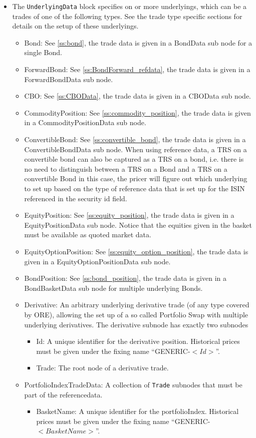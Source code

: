 \begin{itemize}
\item The {\tt UnderlyingData} block specifies on or more underlyings, which can be a trades of one of the following
  types. See the trade type specific sections for details on the setup of these underlyings.
  \begin{itemize}
  \item Bond: See \ref{ss:bond}, the trade data is given in a BondData sub node for a single Bond.
  \item ForwardBond: See \ref{ss:BondForward_refdata}, the trade data is given in a ForwardBondData sub node.
  \item CBO: See \ref{ss:CBOData}, the trade data is given in a CBOData sub node.
  \item CommodityPosition: See \ref{ss:commodity_position}, the trade data is given in a CommodityPositionData sub node.
  \item ConvertibleBond: See \ref{ss:convertible_bond}, the trade data is given in a ConvertibleBondData sub
    node. When using reference data, a TRS on a convertible bond can also be captured as a TRS on a bond, i.e. there is
    no need to distinguish between a TRS on a Bond and a TRS on a convertible Bond in this case, the pricer will figure
    out which underlying to set up based on the type of reference data that is set up for the ISIN referenced in the
    security id field.
  \item EquityPosition: See \ref{ss:equity_position}, the trade data is given in a EquityPositionData sub
    node. Notice that the equities given in the basket must be available as quoted market data.
  \item EquityOptionPosition: See \ref{ss:equity_option_position}, the trade data is given in a EquityOptionPositionData
    sub node.
  \item BondPosition: See \ref{ss:bond_position}, the trade data is given in a BondBasketData sub node for multiple underlying Bonds.
  \item Derivative: An arbitrary underlying derivative trade (of any type covered by ORE), allowing the set up of a so called Portfolio Swap with multiple underlying derivatives. The derivative subnode has
    exactly two subnodes
    \begin{itemize}
      \item Id: A unique identifier for the derivative position. Historical prices must be given under the fixing name
        ``GENERIC-$<Id>$''.
      \item Trade: The root node of a derivative trade.
    \end{itemize}
  \item PortfolioIndexTradeData: A collection of {\tt Trade} subnodes that must be part of the referencedata.
    \begin{itemize}
      \item BasketName: A unique identifier for the portfolioIndex. Historical prices must be given under the fixing name
        ``GENERIC-$<BasketName>$''.
    \end{itemize}


\end{itemize}
\end{itemize}
